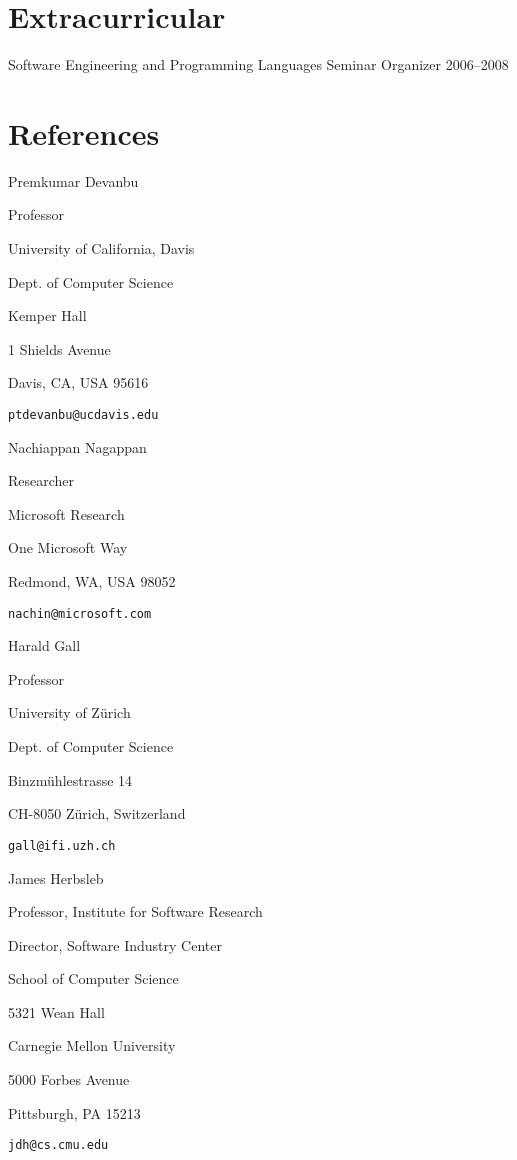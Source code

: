\documentclass[margin,line,article,letterpaper]{res}
\newenvironment{list1}{
  \begin{list}{}{%
      \setlength{\itemsep}{0in}
      \setlength{\parsep}{0in} \setlength{\parskip}{0in}
      \setlength{\topsep}{0in} \setlength{\partopsep}{0in} 
      \setlength{\leftmargin}{0.17in}}}{\end{list}}
\newcommand{\timespan}[1]{#1}
\begin{document}
\begin{resume}
\section{Extracurricular}
Software Engineering and Programming Languages Seminar Organizer \hfill \timespan{2006--2008}

\section{References}

Premkumar Devanbu
\begin{list1}
\item Professor
\item University of California, Davis
\item Dept. of Computer Science
\item Kemper Hall
\item 1 Shields Avenue
\item Davis, CA, USA 95616
\item \texttt{ptdevanbu@ucdavis.edu}
\end{list1}

Nachiappan Nagappan
\begin{list1}
\item Researcher
\item Microsoft Research
\item One Microsoft Way
\item Redmond, WA, USA 98052
\item \texttt{nachin@microsoft.com}
\end{list1}

Harald Gall
\begin{list1}
\item Professor
\item University of Z\"urich
\item Dept. of Computer Science
\item Binzm\"uhlestrasse 14
\item CH-8050 Z\"urich, Switzerland
\item \texttt{gall@ifi.uzh.ch}
\end{list1}

James Herbsleb
\begin{list1}
\item Professor, Institute for Software Research
\item Director, Software Industry Center
\item School of Computer Science
\item 5321 Wean Hall
\item Carnegie Mellon University
\item 5000 Forbes Avenue
\item Pittsburgh, PA 15213
\item \texttt{jdh@cs.cmu.edu}
\end{list1}


\end{resume}
\end{document}
